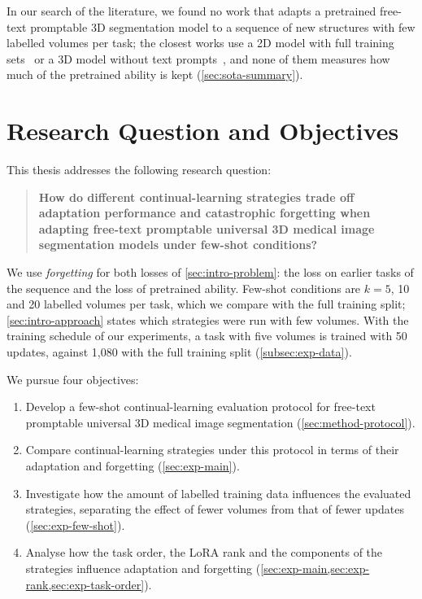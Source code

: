 In our search of the literature, we found no work that adapts a pretrained free-text promptable 3D segmentation model to a sequence of new structures with few labelled volumes per task; the closest works use a 2D model with full training sets~\cite{gao2026medcrpcl,gao2025paewc,gao2026medpeftcl} or a 3D model without text prompts~\cite{chen2026fewshotcontinuallearning3d}, and none of them measures how much of the pretrained ability is kept (\cref{sec:sota-summary}).

\section{Research Question and Objectives}
\label{sec:intro-rq}

This thesis addresses the following research question:
\begin{quote}
\textbf{How do different continual-learning strategies trade off adaptation performance and catastrophic forgetting when adapting free-text promptable universal 3D medical image segmentation models under few-shot conditions?}
\end{quote}
We use \emph{forgetting} for both losses of \cref{sec:intro-problem}: the loss on earlier tasks of the sequence and the loss of pretrained ability.
Few-shot conditions are $k = 5$, 10 and 20 labelled volumes per task, which we compare with the full training split; \cref{sec:intro-approach} states which strategies were run with few volumes.
With the training schedule of our experiments, a task with five volumes is trained with 50 updates, against 1{,}080 with the full training split (\cref{subsec:exp-data}).

We pursue four objectives:
\begin{enumerate}
  \item Develop a few-shot continual-learning evaluation protocol for free-text promptable universal 3D medical image segmentation (\cref{sec:method-protocol}).
  \item Compare continual-learning strategies under this protocol in terms of their adaptation and forgetting (\cref{sec:exp-main}).
  \item Investigate how the amount of labelled training data influences the evaluated strategies, separating the effect of fewer volumes from that of fewer updates (\cref{sec:exp-few-shot}).
  \item Analyse how the task order, the LoRA rank and the components of the strategies influence adaptation and forgetting (\cref{sec:exp-main,sec:exp-rank,sec:exp-task-order}).
\end{enumerate}

